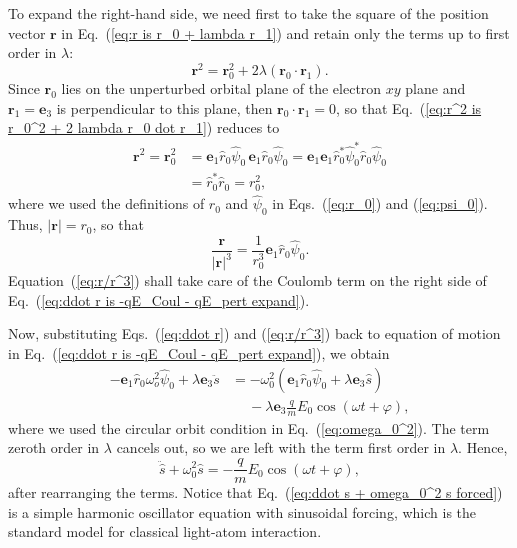\documentclass[twocolumn,showpacs,preprintnumbers,amsmath,amssymb]{revtex4}
\begin{document}
To expand the right-hand side, we need first to take the square of the position vector $\mathbf r$ in Eq.~(\ref{eq:r is r_0 + lambda r_1}) and retain only the terms up to first order in $\lambda$:
\begin{equation}
\label{eq:r^2 is r_0^2 + 2 lambda r_0 dot r_1}
\mathbf r^2 = \mathbf r_0^2+2\lambda(\mathbf r_0\cdot\mathbf r_1). 
\end{equation}
Since $\mathbf r_0$ lies on the unperturbed orbital plane of the electron $xy$ plane and $\mathbf r_1 = \mathbf e_3$ is perpendicular to this plane, then $\mathbf r_0\cdot\mathbf r_1=0$, so that Eq.~(\ref{eq:r^2 is r_0^2 + 2 lambda r_0 dot r_1}) reduces to
\begin{align}
\mathbf r^2 =\mathbf r_0^2 &= \mathbf e_1\hat r_0\hat\psi_0\,\mathbf e_1\hat r_0\hat\psi_0 = \mathbf e_1\mathbf e_1\hat r_0^*\hat\psi_0^*\hat r_0\hat\psi_0 \nonumber \\ 
&= \hat r_0^*\hat r_0 = r_0^2,
\end{align}
where we used the definitions of $\hat r_0$ and $\hat\psi_0$ in Eqs.~(\ref{eq:r_0}) and (\ref{eq:psi_0}). Thus, $|\mathbf r|=r_0$, so that
\begin{equation}
\label{eq:r/r^3}
\frac{\mathbf r}{|\mathbf r|^3} = \frac{1}{r_0^3}\mathbf e_1 \hat r_0\hat\psi_0.
\end{equation}
Equation~(\ref{eq:r/r^3}) shall take care of the Coulomb term on the right side of Eq.~(\ref{eq:ddot r is -qE_Coul - qE_pert expand}).

Now, substituting Eqs.~(\ref{eq:ddot r}) and (\ref{eq:r/r^3}) back to equation of motion in Eq.~(\ref{eq:ddot r is -qE_Coul - qE_pert expand}), we obtain
\begin{align}
-\mathbf e_1\hat r_0\omega_{o}^{2}\hat\psi_0+\lambda \mathbf e_3\ddot s &= 
-\omega_0^2(\mathbf e_1\hat r_0\hat\psi_0 + \lambda\mathbf e_3 \hat s) \nonumber \\&\quad \ - \lambda\mathbf e_3\frac{q}{m}E_0\cos(\omega t + \varphi),
\end{align}
where we used the circular orbit condition in Eq.~(\ref{eq:omega_0^2}). The term zeroth order in $\lambda$ cancels out, so we are left with the term first order in $\lambda$.  Hence,
\begin{equation}
\label{eq:ddot s + omega_0^2 s forced}
\ddot{ \hat s } + \omega_0^2 \hat s = -\frac{q}{m}E_0\cos(\omega t + \varphi),
\end{equation}
after rearranging the terms.  Notice that Eq.~(\ref{eq:ddot s + omega_0^2 s forced}) is a simple harmonic oscillator equation with sinusoidal forcing, which is the standard model for classical light-atom interaction.
\end{document}
